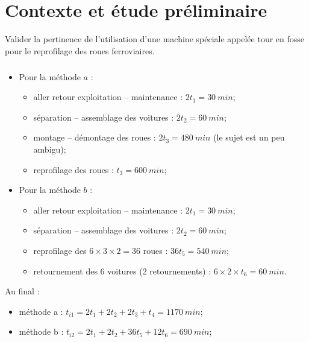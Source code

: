 \documentclass[10pt,fleqn]{article} %
\begin{document}

\vspace{4.5cm}
\pagestyle{fancy}
\thispagestyle{plain}


\def\columnseprulecolor{\color{ocre}}
\setlength{\columnseprule}{0.4pt} 

\section{Contexte et étude préliminaire}

\begin{obj}
Valider la pertinence de l’utilisation d’une machine spéciale appelée tour en fosse pour le reprofilage
des roues ferroviaires.
\end{obj}

\subparagraph{}

\begin{itemize}
\item Pour la méthode $a$ :
\begin{itemize}
\item aller retour exploitation -- maintenance : $2t_1 = \SI{30}{min}$;
\item séparation -- assemblage des voitures : $2t_2 = \SI{60}{min}$;
\item montage -- démontage des roues : $2t_3 = \SI{480}{min}$  (le sujet est un peu ambigu);
\item reprofilage des roues : $t_3 = \SI{600}{min}$;
\end{itemize}
\item Pour la méthode $b$ :
\begin{itemize}
\item aller retour exploitation -- maintenance : $2t_1 = \SI{30}{min}$;
\item séparation -- assemblage des voitures : $2t_2 = \SI{60}{min}$;
\item reprofilage des $6 \times 3 \times 2 = 36$ roues  : $36 t_5 = \SI{540}{min} $;
\item retournement  des 6 voitures (2 retournements) : $6\times2\times t_6 =\SI{60}{min}$.
\end{itemize}
\end{itemize}
Au final : 
\begin{itemize}
\item méthode a : $t_{i1} = 2t_1 +2t_2+2t_3+t_4 = \SI{1170}{min}$;
\item méthode b : $t_{i2} = 2t_1 +2t_2+36 t_5+12 t_6 = \SI{690}{min}$;
\end{itemize}
\end{document}
